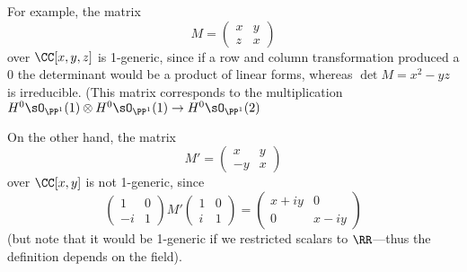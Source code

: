 \begin{example}
For example, the matrix 
$$
M = \begin{pmatrix}
 x &y\\
 z&x
\end{pmatrix}
$$
over $\CC[x,y,z]$ is  1-generic, since if a row and column transformation produced a 0 the determinant would be a product of linear forms, whereas
$\det M = x^2-yz$ is irreducible. (This matrix corresponds to the multiplication 
$H^{0}\sO_{\PP^{1}}(1) \otimes
H^{0}\sO_{\PP^{1}}(1) 
\to H^{0}\sO_{\PP^{1}}(2) 
$

On the other hand, the matrix
$$
M' = \begin{pmatrix}
 x &y\\
 -y&x
\end{pmatrix}
$$
over $\CC[x,y]$ is not 1-generic, since
$$
\begin{pmatrix}
1&0\\
-i&1 
\end{pmatrix}
M'
\begin{pmatrix}
 1&0\\
 i&1
\end{pmatrix}
= 
\begin{pmatrix}
 x+iy&0\\
 0&x-iy
\end{pmatrix}
$$
(but note that it would be 1-generic if we restricted scalars to $\RR$---thus the definition depends on the field).
\end{example}

